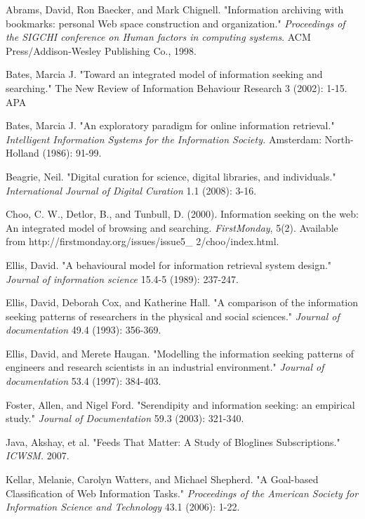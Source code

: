 \documentclass{casconpaper}
\begin{document}
{\begin{thebibliography}{9}
Abrams, David, Ron Baecker, and Mark Chignell. "Information archiving with bookmarks: personal Web space construction and organization." \emph{Proceedings of the SIGCHI conference on Human factors in computing systems}. ACM Press/Addison-Wesley Publishing Co., 1998.

Bates, Marcia J. "Toward an integrated model of information seeking and searching." The New Review of Information Behaviour Research 3 (2002): 1-15.
APA	

Bates, Marcia J. "An exploratory paradigm for online information retrieval." \emph{Intelligent Information Systems for the Information Society.} Amsterdam: North-Holland (1986): 91-99.

Beagrie, Neil. "Digital curation for science, digital libraries, and individuals." \emph{International Journal of Digital Curation} 1.1 (2008): 3-16.

Choo, C. W., Detlor, B., and Tunbull, D. (2000). Information seeking on the web: An integrated model of browsing and searching.  \emph{FirstMonday}, 5(2). Available from http://firstmonday.org/issues/issue5\_
2/choo/index.html.

Ellis, David. "A behavioural model for information retrieval system design." \emph{Journal of information science} 15.4-5 (1989): 237-247.

Ellis, David, Deborah Cox, and Katherine Hall. "A comparison of the information seeking patterns of researchers in the physical and social sciences." \emph{Journal of documentation} 49.4 (1993): 356-369.

Ellis, David, and Merete Haugan. "Modelling the information seeking patterns of engineers and research scientists in an industrial environment." \emph{Journal of documentation} 53.4 (1997): 384-403.

Foster, Allen, and Nigel Ford. "Serendipity and information seeking: an empirical study." \emph{Journal of Documentation} 59.3 (2003): 321-340.

	Java, Akshay, et al. "Feeds That Matter: A Study of Bloglines Subscriptions." \emph{ ICWSM.} 2007.
   
 Kellar, Melanie, Carolyn Watters, and Michael Shepherd. "A Goal-based Classification of Web Information Tasks." \emph{Proceedings of the American Society for Information Science and Technology} 43.1 (2006): 1-22.


\end{thebibliography}}
\end{document}
